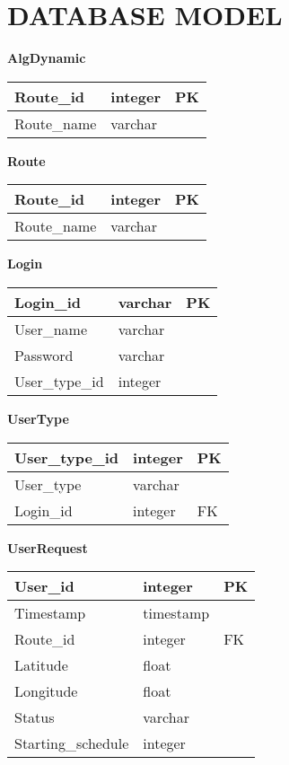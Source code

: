 \section{DATABASE MODEL}
\setlength{\parindent}{0em}
\textbf{AlgDynamic}
\begin{table}[H]
	\centering
	\begin{tabular}{| m{4cm} | m{4cm} | m{4cm} |}
		\hline
		Route\_id & integer & PK\\
		\hline
		Route\_name & varchar & \\
		\hline
	\end{tabular}
\end{table}
\textbf{Route}
\begin{table}[H]
	\centering
	\begin{tabular}{| m{4cm} | m{4cm} | m{4cm} |}
		\hline
		Route\_id & integer & PK\\
		\hline
		Route\_name & varchar & \\
		\hline
	\end{tabular}
\end{table}
\textbf{Login}
\begin{table}[H]
	\centering
	\begin{tabular}{| m{4cm} | m{4cm} | m{4cm} |}
		\hline
		Login\_id & varchar & PK\\
		\hline
		User\_name & varchar & \\
		\hline
		Password & varchar & \\
		\hline
		User\_type\_id & integer & \\
		\hline
	\end{tabular}
\end{table}
\textbf{UserType}
\begin{table}[H]
	\centering
	\begin{tabular}{| m{4cm} | m{4cm} | m{4cm} |}
		\hline
		User\_type\_id & integer & PK\\
		\hline
		User\_type & varchar & \\
		\hline
		Login\_id & integer & FK\\
		\hline
	\end{tabular}
\end{table}
\textbf{UserRequest}
\begin{table}[H]
	\centering
	\begin{tabular}{| m{4cm} | m{4cm} | m{4cm} |}
		\hline
		User\_id & integer & PK\\
		\hline
		Timestamp & timestamp & \\
		\hline
		Route\_id & integer & FK\\
		\hline
		Latitude & float & \\
		\hline
		Longitude & float & \\
		\hline
		Status & varchar & \\
		\hline
		Starting\_schedule & integer & \\
		\hline
	\end{tabular}
\end{table}
